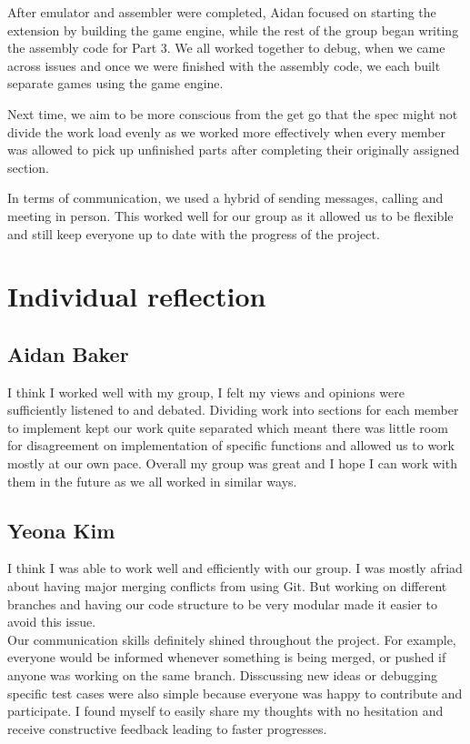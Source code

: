 \documentclass{article}
\begin{document}
After emulator and assembler were completed, Aidan focused on starting the extension by building the game engine, while the rest of the group began writing the assembly code for Part 3. We all worked together to debug, when we came across issues and once we were finished with the assembly code, we each built separate games using the game engine. 

Next time, we aim to be more conscious from the get go that the spec might not divide the work load evenly as we worked more effectively when every member was allowed to pick up unfinished parts after completing their originally assigned section.

In terms of communication, we used a hybrid of sending messages, calling and meeting in person. This worked well for our group as it allowed us to be flexible and still keep everyone up to date with the progress of the project.

\section{Individual reflection}

\subsection{Aidan Baker}
I think I worked well with my group, I felt my views and opinions were sufficiently listened to and debated. Dividing work into sections for each member to implement kept our work quite separated which meant there was little room for disagreement on implementation of specific functions and allowed us to work mostly at our own pace. 
Overall my group was great and I hope I can work with them in the future as we all worked in similar ways.

\subsection{Yeona Kim}
I think I was able to work well and efficiently with our group. I was mostly afriad about having major merging conflicts from using Git. But working on different branches and having our code structure to be very modular made it easier to avoid this issue.\\

Our communication skills definitely shined throughout the project. For example, everyone would be informed whenever something is being merged, or pushed if anyone was working on the same branch. Disscussing new ideas or debugging specific test cases were also simple because everyone was happy to contribute and participate. I found myself to easily share my thoughts with no hesitation and receive constructive feedback leading to faster progresses.
\end{document}
